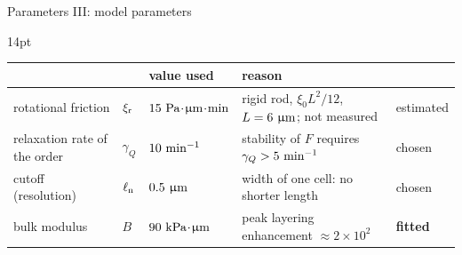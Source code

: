 \documentclass[12pt,aspectratio=169]{beamer}
\newcommand{\tagC}{{\scriptsize\color{darkorange}chosen}}
\newcommand{\tagE}{{\scriptsize\color{purple}estimated}}
\newcommand{\tagF}{{\scriptsize\color{darkred}\textbf{fitted}}}
\begin{document}
\begin{frame}[t]{Parameters III: model parameters}
\begin{wide}{14pt}
\footnotesize
\renewcommand{\arraystretch}{1.2}
\setlength{\tabcolsep}{3.5pt}
\begin{tabular}{@{}l l l >{\raggedright\arraybackslash}p{6.3cm} l@{}}
\toprule
 & & value used & reason & \\
\midrule
rotational friction & $\xir$ & $15~\Pa\tcdot\micron\tcdot\minute$ & rigid rod, $\xi_0L^2/12$, $L=6~\micron$; not measured & \tagE\\
relaxation rate of the order & $\gamma_Q$ & $10~\minute^{-1}$ & stability of $F$ requires $\gamma_Q>5~\minute^{-1}$ & \tagC\\
cutoff (resolution) & $\elln$ & $0.5~\micron$ & width of one cell: no shorter length & \tagC\\
bulk modulus & $B$ & $90~\kPa\tcdot\micron$ & peak layering enhancement $\approx2\times10^2$ & \tagF\\
\bottomrule
\end{tabular}
\end{wide}


\end{frame}
\end{document}

